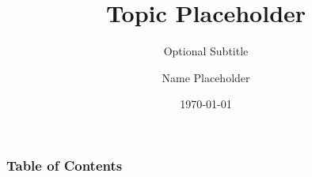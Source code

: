 \documentclass[english]{beamer}
\title{Topic Placeholder}
\subtitle{Optional Subtitle}
\author{Name Placeholder}
\date{\today}
\begin{document}
    \begin{frame}
        \titlepage
    \end{frame}
    \begin{frame}
        \frametitle{Table of Contents}
        \tableofcontents
    \end{frame}

    
    

    
\end{document}
